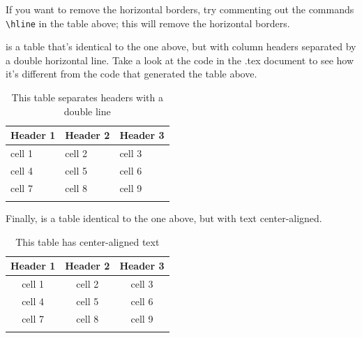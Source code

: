 \documentclass[output=paper,colorlinks,citecolor=brown]{langscibook}
\begin{document}
\noindent If you want to remove the horizontal borders, try commenting out the commands \verb|\hline| in the table above; this will remove the horizontal borders.


 is a table that's identical to the one above, but with column headers separated by a double horizontal line. Take a look at the code in the .tex document to see how it's different from the code that generated the table above. %

\begin{table}

  \caption{This table separates headers with a double line}
  \label{tab:diercks:SampleTableHeaders}
  
\begin{tabular}{lll}
\lsptoprule %
Header 1 & Header 2 & Header 3 \\
\hline\hline
cell 1 & cell 2 & cell 3 \\
\hline
cell 4 & cell 5 & cell 6 \\
\hline
cell 7 & cell 8 & cell 9 \\
\lspbottomrule %


\end{tabular}
\end{table}

\noindent Finally,  is a table identical to the one above, but with text center-aligned.

\begin{table}

  \caption{This table has center-aligned text}
  \label{tab:diercks:SampleTableCenter}

\begin{tabular}{ccc}
\lsptoprule %
Header 1 & Header 2 & Header 3 \\
\hline\hline
cell 1 & cell 2 & cell 3 \\
\hline
cell 4 & cell 5 & cell 6 \\
\hline
cell 7 & cell 8 & cell 9 \\
\lspbottomrule %

\end{tabular}
\end{table}
\end{document}
